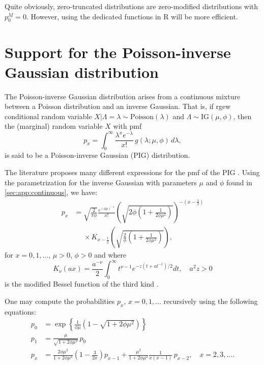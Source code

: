 \documentclass[x11names]{article}
\newcommand{\proglang}[1]{\textsf{#1}}
\begin{document}
Quite obviously, zero-truncated distributions are zero-modified
distributions with $p_0^M = 0$. However, using the dedicated functions
in \proglang{R} will be more efficient.


\section{Support for the Poisson-inverse Gaussian distribution}
\label{sec:pig}

The Poisson-inverse Gaussian distribution arises from a continuous
mixture between a Poisson distribution and an inverse Gaussian. That
is, if rgew conditional random variable
$X|\Lambda = \lambda \sim \text{Poisson}(\lambda)$ and
$\Lambda \sim \text{IG}(\mu, \phi)$, then the (marginal) random
variable $X$ with pmf
\begin{equation*}
  p_x = \int_0^\infty \frac{\lambda^x e^{-\lambda}}{x!}\, g(\lambda;
  \mu, \phi)\, d\lambda,
\end{equation*}
is said to be a Poisson-inverse Gaussian (PIG) distribution.

The literature proposes many different expressions for the pmf of the
PIG
\citep{Holla:PIG:1966,Shaban:PIG:1981,Johnson:discrete:2005,LossModels4e}.
Using the parametrization for the inverse Gaussian with parameters
$\mu$ and $\phi$ found in \autoref{sec:app:continuous}, we have:
\begin{equation}
  \label{eq:pig:px}
  \begin{split}
    p_x &= \sqrt{\frac{2}{\pi \phi}} \frac{e^{(\phi\mu)^{-1}}}{x!}
    \left(
      \sqrt{2\phi \left( 1 + \frac{1}{2\phi\mu^2} \right)}
    \right)^{-(x - \frac{1}{2})} \\
    &\phantom{=} \times K_{x - \frac{1}{2}} \left( \sqrt{\frac{2}{\phi}\left(1
          + \frac{1}{2\phi\mu^2}\right)} \right),
  \end{split}
\end{equation}
for $x = 0, 1, \dots$, $\mu > 0$, $\phi > 0$ and where
\begin{equation*}
  K_\nu(ax) = \frac{a^{-\nu}}{2} \int_0^\infty t^{\nu - 1}
  e^{- z(t + at^{-1})/2} dt, \quad a^2 z > 0
\end{equation*}
is the modified Bessel function of the third kind
\citep{Bateman:1953:2,Abramowitz:1972}.

One may compute the probabilities $p_x$, $x = 0, 1, \dots$ recursively
using the following equations:
\begin{equation}
  \label{eq:pig:px:recursive}
  \begin{split}
    p_0 &= \exp\left\{
      \frac{1}{\phi\mu} \left(1 - \sqrt{1 + 2\phi\mu^2}\right)
    \right\} \\
    p_1 &= \frac{\mu}{\sqrt{1 + 2\phi\mu^2}}\, p_0 \\
    p_x &= \frac{2\phi\mu^2}{1 + 2\phi\mu^2} \left( 1 - \frac{3}{2x}
    \right) p_{x - 1} + \frac{\mu^2}{1 + 2\phi\mu^2} \frac{1}{x(x -
      1)}\, p_{x - 2}, \quad x = 2, 3, \dots.
  \end{split}
\end{equation}
\end{document}
